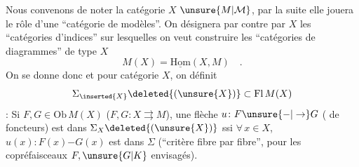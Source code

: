 Nous  convenons de noter la catégorie $X$
$\unsure{M|\mathcal{M}}$,  par la suite elle jouera le rôle d'une
``catégorie de modèles''. On désignera par contre
par $X$ les ``catégories d'indices'' sur lesquelles
on veut construire les  ``catégories de
diagrammes'' de type $X$
\[
M(X)=\underline{\mathrm{Hom}}(X,M)\quad .
\]
On se donne donc
et pour  catégorie $X$, on définit
\[
\Sigma_{\inserted{X}}\deleted{(\unsure{X})}\subset\mathrm{Fl}\,M(X)
\]
 : Si $F,G\in\mathrm{Ob}\,M(X)$ ($F,G\colon X\rightrightarrows M$),
une flèche $u\colon F\unsure{\mathord{-}|\to}G$ ( de foncteurs)
est dans $\Sigma_X\deleted{(\unsure{X})}$ ssi $\forall\,x\in X$, $u(x)\colon F(x)\mathord{-}G(x)$
est dans $\Sigma$ (``critère  fibre par fibre'', pour
 les copréfaisceaux $F,\unsure{G|K}$ envisagés).

